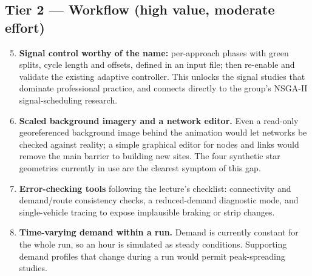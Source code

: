 \documentclass[11pt,a4paper]{article}
\begin{document}
\subsection*{Tier 2 --- Workflow (high value, moderate effort)}
\begin{enumerate}\setcounter{enumi}{4}
  \item \textbf{Signal control worthy of the name:} per-approach phases with green
        splits, cycle length and offsets, defined in an input file; then re-enable
        and validate the existing adaptive controller. This unlocks the signal
        studies that dominate professional practice, and connects directly to the
        group's NSGA-II signal-scheduling research.
  \item \textbf{Scaled background imagery and a network editor.} Even a read-only
        georeferenced background image behind the animation would let networks be
        checked against reality; a simple graphical editor for nodes and links would
        remove the main barrier to building new sites. The four synthetic star
        geometries currently in use are the clearest symptom of this gap.
  \item \textbf{Error-checking tools} following the lecture's checklist: connectivity
        and demand/route consistency checks, a reduced-demand diagnostic mode, and
        single-vehicle tracing to expose implausible braking or strip changes.
  \item \textbf{Time-varying demand within a run.} Demand is currently constant for
        the whole run, so an hour is simulated as steady conditions. Supporting
        demand profiles that change during a run would permit peak-spreading studies.
\end{enumerate}
\end{document}
